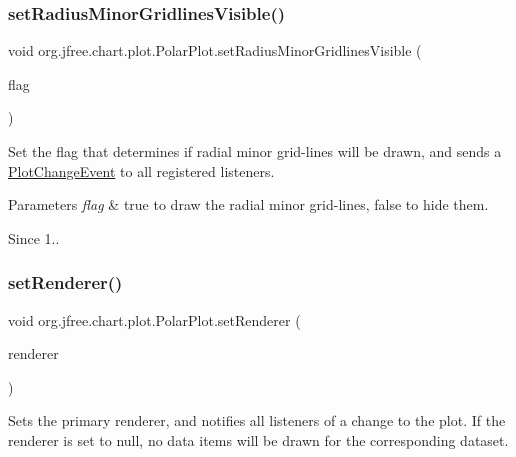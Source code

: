 \subsubsection{\texorpdfstring{set\+Radius\+Minor\+Gridlines\+Visible()}{setRadiusMinorGridlinesVisible()}}
{\footnotesize\ttfamily void org.\+jfree.\+chart.\+plot.\+Polar\+Plot.\+set\+Radius\+Minor\+Gridlines\+Visible (\begin{DoxyParamCaption}\item[{boolean}]{flag }\end{DoxyParamCaption})}

Set the flag that determines if radial minor grid-\/lines will be drawn, and sends a \mbox{\hyperlink{}{Plot\+Change\+Event}} to all registered listeners.


\begin{DoxyParams}{Parameters}
{\em flag} & {\ttfamily true} to draw the radial minor grid-\/lines, {\ttfamily false} to hide them. \\
\hline
\end{DoxyParams}
\begin{DoxySince}{Since}
1.. 
\end{DoxySince}
\mbox{\label{classorg_1_1jfree_1_1chart_1_1plot_1_1_polar_plot_a0f5968ac9a7b8c8bff650d6e50881135}} 
\subsubsection{\texorpdfstring{set\+Renderer()}{setRenderer()}\hspace{0.1cm}{\footnotesize\ttfamily [1/3]}}
{\footnotesize\ttfamily void org.\+jfree.\+chart.\+plot.\+Polar\+Plot.\+set\+Renderer (\begin{DoxyParamCaption}\item[{\mbox{\hyperlink{interfaceorg_1_1jfree_1_1chart_1_1renderer_1_1_polar_item_renderer}{Polar\+Item\+Renderer}}}]{renderer }\end{DoxyParamCaption})}

Sets the primary renderer, and notifies all listeners of a change to the plot. If the renderer is set to {\ttfamily null}, no data items will be drawn for the corresponding dataset.


